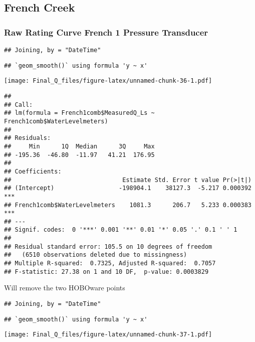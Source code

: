 \documentclass[
]{article}
\begin{document}
\hypertarget{french-creek}{%
\subsection{French Creek}\label{french-creek}}

\hypertarget{raw-rating-curve-french-1-pressure-transducer}{%
\subsubsection{Raw Rating Curve French 1 Pressure
Transducer}\label{raw-rating-curve-french-1-pressure-transducer}}

\begin{verbatim}
## Joining, by = "DateTime"
\end{verbatim}

\begin{verbatim}
## `geom_smooth()` using formula 'y ~ x'
\end{verbatim}

\texttt{[image: Final\_Q\_files/figure-latex/unnamed-chunk-36-1.pdf]}

\begin{verbatim}
## 
## Call:
## lm(formula = French1comb$MeasuredQ_Ls ~ French1comb$WaterLevelmeters)
## 
## Residuals:
##     Min      1Q  Median      3Q     Max 
## -195.36  -46.80  -11.97   41.21  176.95 
## 
## Coefficients:
##                               Estimate Std. Error t value Pr(>|t|)    
## (Intercept)                  -198904.1    38127.3  -5.217 0.000392 ***
## French1comb$WaterLevelmeters    1081.3      206.7   5.233 0.000383 ***
## ---
## Signif. codes:  0 '***' 0.001 '**' 0.01 '*' 0.05 '.' 0.1 ' ' 1
## 
## Residual standard error: 105.5 on 10 degrees of freedom
##   (6510 observations deleted due to missingness)
## Multiple R-squared:  0.7325, Adjusted R-squared:  0.7057 
## F-statistic: 27.38 on 1 and 10 DF,  p-value: 0.0003829
\end{verbatim}

Will remove the two HOBOware points

\begin{verbatim}
## Joining, by = "DateTime"
\end{verbatim}

\begin{verbatim}
## `geom_smooth()` using formula 'y ~ x'
\end{verbatim}

\texttt{[image: Final\_Q\_files/figure-latex/unnamed-chunk-37-1.pdf]}
\end{document}
